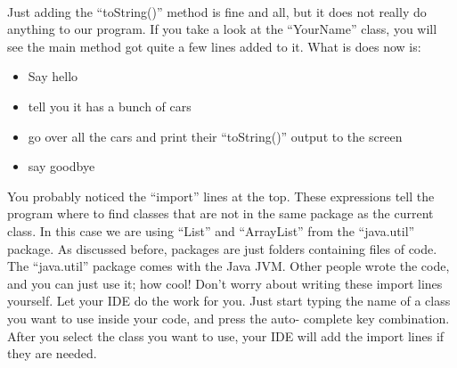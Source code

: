 \documentclass[11pt,fleqn]{book} %
\begin{document}
\paragraph{} Just adding the ``toString()'' method is fine and all, but it does not really do anything to our program. If you take a look at the ``YourName'' class, you will see the main method got quite a few lines added to it. What is does now is:
\begin{itemize}
\item Say hello
\item tell you it has a bunch of cars
\item go over all the cars and print their ``toString()'' output to the screen
\item say goodbye
\end{itemize}

\begin{remark}
	You probably noticed the ``import'' lines at the top. These expressions tell the program where to find classes that are not in the same package as the current class.
	In this case we are using ``List'' and ``ArrayList'' from the ``java.util'' package. As discussed before, packages are just folders containing files of code. The ``java.util'' package 
	comes with the Java JVM. Other people wrote the code, and you can just use it; how cool! 
	Don't worry about writing these import lines yourself. Let your IDE do the work for you. Just start typing the name of a class you want to use inside your code, and press the auto-			complete key combination. After you select the class you want to use, your IDE will add the import lines if they are needed.
\end{remark}
\end{document}
